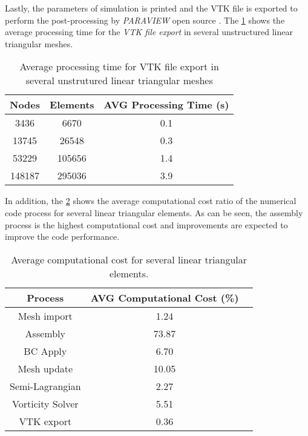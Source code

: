 \medskip
Lastly, the parameters of simulation is printed and
the VTK file is exported to perform the post-processing by
\textit{PARAVIEW} open source \cite{paraview}. 
The \ref{tempo export vtk} 
shows the average processing time for the \textit{VTK file export}
in several unstructured linear triangular meshes.

\vspace{0.5cm}
\begin{table}[H]
\caption{Average processing time for VTK file export in several unstrutured linear triangular meshes}
\centering
\begin{tabular}{ccc}
\toprule
\textbf{Nodes} & \textbf{Elements} & \textbf{AVG Processing Time} (s) \\
\midrule
3436 & 6670 & 0.1 \\
13745 & 26548 & 0.3 \\
53229 & 105656 & 1.4 \\
148187 & 295036 & 3.9 \\



\bottomrule
\end{tabular}
\label{tempo export vtk}
\end{table}



\medskip
In addition, the \ref{time ratio} shows the average computational
cost ratio
of the numerical code process for several linear triangular elements. 
As can be seen,
the assembly process is the highest computational cost
and improvements are expected to improve the code performance.


\vspace{0.5cm}
\begin{table}[H]
\caption{Average computational cost for several linear triangular elements.}
\centering
\begin{tabular}{ccc}
\toprule
\textbf{Process} & \textbf{AVG Computational Cost} (\%) \\
\midrule
Mesh import & 1.24 \\
Assembly & 73.87 \\
BC Apply & 6.70 \\
Mesh update & 10.05 \\
Semi-Lagrangian & 2.27 \\
Vorticity Solver & 5.51 \\
VTK export & 0.36 \\
\bottomrule
\end{tabular}
\label{time ratio}
\end{table}


